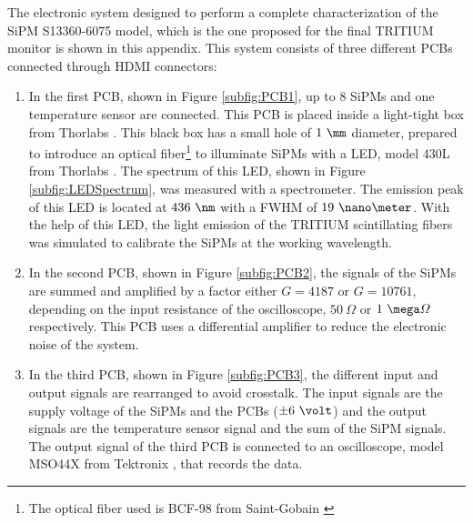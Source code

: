 The electronic system designed to perform a complete characterization of the SiPM S13360-6075 model, which is the one proposed for the final TRITIUM monitor is shown in this appendix. This system consists of three different PCBs connected through HDMI connectors:

\begin{enumerate}
\item{} In the first PCB, shown in Figure \ref{subfig:PCB1}, up to 8 SiPMs and one temperature sensor are connected. This PCB is placed inside a light-tight box from Thorlabs \cite{ThorlabsCompany}. This black box has a small hole of $1~\mm$ diameter, prepared to introduce an optical fiber\footnote{The optical fiber used is BCF-98 from Saint-Gobain \cite{OpticalFibers}} to illuminate SiPMs with a LED, model 430L from Thorlabs \cite{LEDThorlabs}. The spectrum of this LED, shown in Figure \ref{subfig:LEDSpectrum}, was measured with a spectrometer. The emission peak of this LED is located at $436~\nm$ with a FWHM of $19~\nano\meter$. With the help of this LED, the light emission of the TRITIUM scintillating fibers was simulated to calibrate the SiPMs at the working wavelength. 

\item{} In the second PCB, shown in Figure \ref{subfig:PCB2}, the signals of the SiPMs are summed and amplified by a factor either $G=4187$ or $G=10761$, depending on the input resistance of the oscilloscope, $50~\varOmega$ or $1~\mega\varOmega$ respectively. This PCB uses a differential amplifier to reduce the electronic noise of the system.

\item{} In the third PCB, shown in Figure \ref{subfig:PCB3}, the different input and output signals are rearranged to avoid crosstalk. The input signals are the supply voltage of the SiPMs and the PCBs ($\pm 6~\volt$) and the output signals are the temperature sensor signal and the sum of the SiPM signals. The output signal of the third PCB is connected to an oscilloscope, model MSO44X from Tektronix \cite{Oscilloscope}, that records the data.

\end{enumerate}

